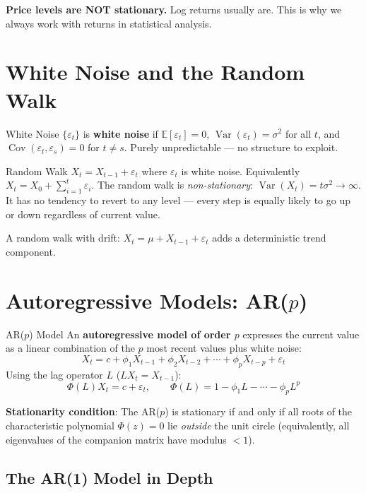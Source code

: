\documentclass[12pt,a4paper,openany]{report}
\theoremstyle{definition}
\newcommand{\E}{\mathbb{E}}
\newcommand{\Var}{\operatorname{Var}}
\newcommand{\Cov}{\operatorname{Cov}}
\begin{document}
\textbf{Price levels are NOT stationary.} Log returns usually are. This is why we always work with returns in statistical analysis.

\section{White Noise and the Random Walk}

\begin{definitionbox}{White Noise}
$\{\varepsilon_t\}$ is \textbf{white noise} if $\E[\varepsilon_t] = 0$, $\Var(\varepsilon_t) = \sigma^2$ for all $t$, and $\Cov(\varepsilon_t, \varepsilon_s) = 0$ for $t \neq s$. Purely unpredictable — no structure to exploit.
\end{definitionbox}

\begin{definitionbox}{Random Walk}
$X_t = X_{t-1} + \varepsilon_t$ where $\varepsilon_t$ is white noise. Equivalently $X_t = X_0 + \sum_{i=1}^t \varepsilon_i$.
The random walk is \emph{non-stationary}: $\Var(X_t) = t\sigma^2 \to \infty$. It has no tendency to revert to any level — every step is equally likely to go up or down regardless of current value.
\end{definitionbox}

A random walk with drift: $X_t = \mu + X_{t-1} + \varepsilon_t$ adds a deterministic trend component.

\section{Autoregressive Models: AR(\texorpdfstring{$p$}{p})}

\begin{definitionbox}{AR($p$) Model}
An \textbf{autoregressive model of order $p$} expresses the current value as a linear combination of the $p$ most recent values plus white noise:
\[
  X_t = c + \phi_1 X_{t-1} + \phi_2 X_{t-2} + \cdots + \phi_p X_{t-p} + \varepsilon_t
\]
Using the lag operator $L$ ($LX_t = X_{t-1}$):
\[
  \Phi(L)X_t = c + \varepsilon_t, \qquad \Phi(L) = 1 - \phi_1 L - \cdots - \phi_p L^p
\]
\end{definitionbox}

\textbf{Stationarity condition}: The AR($p$) is stationary if and only if all roots of the characteristic polynomial $\Phi(z) = 0$ lie \emph{outside} the unit circle (equivalently, all eigenvalues of the companion matrix have modulus $< 1$).

\subsection{The AR(1) Model in Depth}
\end{document}

